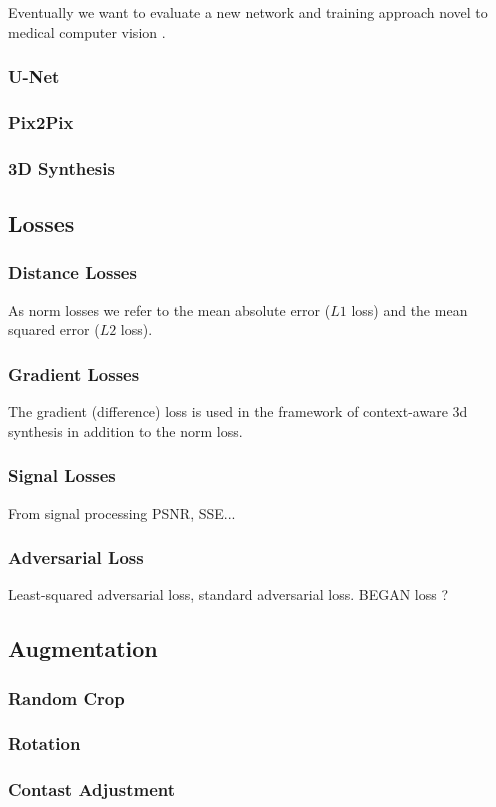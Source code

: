 Eventually we want to evaluate a new network and training approach novel to
medical computer vision \cite{Karras17}.

\subsubsection{U-Net}


\subsubsection{Pix2Pix}

\subsubsection{3D Synthesis}

\subsection{Losses}

\subsubsection{Distance Losses}

As norm losses we refer to the mean absolute error ($L1$ loss) and the
mean squared error ($L2$ loss).

\subsubsection{Gradient Losses}

The gradient (difference) loss is used in the framework of context-aware
3d synthesis \cite{Nie16} in addition to the norm loss.

\subsubsection{Signal Losses}

From signal processing PSNR, SSE...

\subsubsection{Adversarial Loss}

Least-squared adversarial loss, standard adversarial loss. BEGAN loss ?


\subsection{Augmentation}

\subsubsection{Random Crop}
\subsubsection{Rotation}
\subsubsection{Contast Adjustment}

